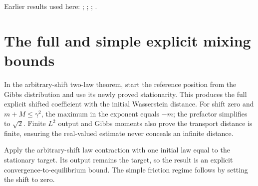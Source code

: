 \documentclass[11pt,a4paper]{article}
\begin{document}
Earlier results used here: \cite[Section~3.26.13]{LangevinLean2026ULASC}; \cite[Section~3.26.15]{LangevinLean2026ULASC}; \cite[Section~3.26.3]{LangevinLean2026ULASC}; \cite[Section~3.8.17]{LangevinLean2026ULASC}.

\section{\texorpdfstring{The full and simple explicit mixing bounds}{The full and simple explicit mixing bounds}}


In the arbitrary-shift two-law theorem, start the reference position from the Gibbs distribution and use its newly proved stationarity. This produces the full explicit shifted coefficient with the initial Wasserstein distance. For shift zero and \(m+M\le\gamma^2\), the maximum in the exponent equals \(-m\); the prefactor simplifies to \(\sqrt2\). Finite \(L^{2}\) output and Gibbs moments also prove the transport distance is finite, ensuring the real-valued estimate never conceals an infinite distance.



Apply the arbitrary-shift law contraction with one initial law equal to the stationary target. Its output remains the target, so the result is an explicit convergence-to-equilibrium bound. The simple friction regime follows by setting the shift to zero.
\end{document}
